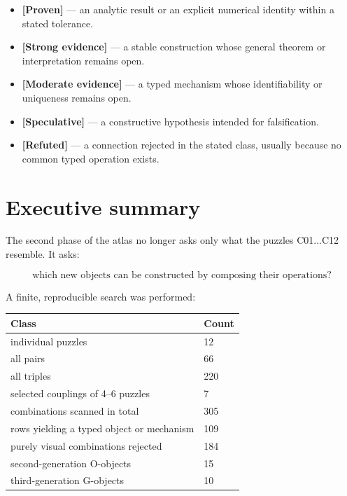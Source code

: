 \documentclass[11pt,a4paper,openany]{report}
\newcommand{\statusProven}{\textcolor{fingreen}{[Proven]}}
\newcommand{\statusStrong}{\textcolor{finblue}{[Strong evidence]}}
\newcommand{\statusModerate}{\textcolor{finviolet}{[Moderate evidence]}}
\newcommand{\statusSpeculative}{\textcolor{finorange}{[Speculative]}}
\newcommand{\statusRefuted}{\textcolor{finred}{[Refuted]}}
\begin{document}
\begin{itemize}
\item 
\textbf{\statusProven{}} --- an analytic result or an explicit numerical identity within a stated tolerance.

\item 
\textbf{\statusStrong{}} --- a stable construction whose general theorem or interpretation remains open.

\item 
\textbf{\statusModerate{}} --- a typed mechanism whose identifiability or uniqueness remains open.

\item 
\textbf{\statusSpeculative{}} --- a constructive hypothesis intended for falsification.

\item 
\textbf{\statusRefuted{}} --- a connection rejected in the stated class, usually because no common typed operation exists.

\end{itemize}

\chapter{Executive summary}

The second phase of the atlas no longer asks only what the puzzles C01...C12 resemble. It asks:

\[
\text{which new objects can be constructed by composing their operations?}
\]

A finite, reproducible search was performed:

\begin{center}
\begingroup\small
\setlength{\tabcolsep}{2.5pt}
\renewcommand{\arraystretch}{1.16}
\begin{longtable}{@{}p{}p{}@{}}
\toprule
\textbf{Class} & \textbf{Count} \\
\midrule
\endhead
individual puzzles & 12 \\
all pairs & 66 \\
all triples & 220 \\
selected couplings of 4--6 puzzles & 7 \\
combinations scanned in total & 305 \\
rows yielding a typed object or mechanism & 109 \\
purely visual combinations rejected & 184 \\
second-generation O-objects & 15 \\
third-generation G-objects & 10 \\
\bottomrule
\end{longtable}
\endgroup
\end{center}
\end{document}
